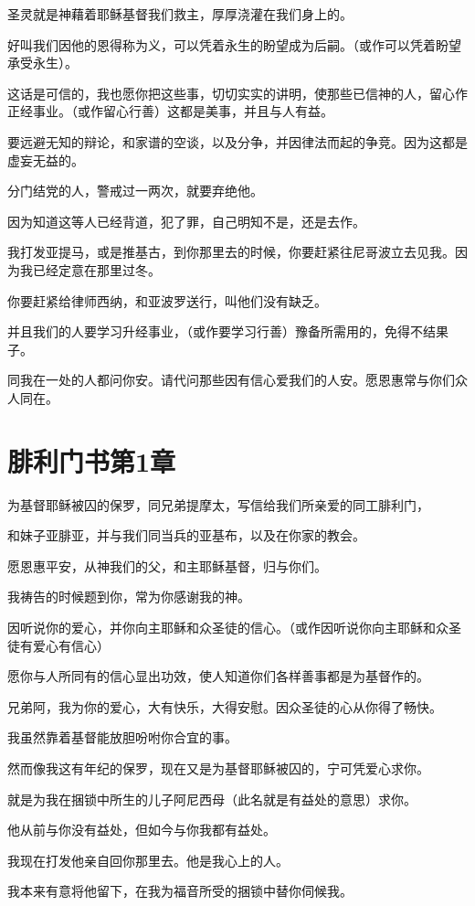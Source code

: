 \documentclass[12pt,oneside]{book}
\begin{document}
圣灵就是神藉着耶稣基督我们救主，厚厚浇灌在我们身上的。

好叫我们因他的恩得称为义，可以凭着永生的盼望成为后嗣。（或作可以凭着盼望承受永生）。

这话是可信的，我也愿你把这些事，切切实实的讲明，使那些已信神的人，留心作正经事业。（或作留心行善）这都是美事，并且与人有益。

要远避无知的辩论，和家谱的空谈，以及分争，并因律法而起的争竞。因为这都是虚妄无益的。

分门结党的人，警戒过一两次，就要弃绝他。

因为知道这等人已经背道，犯了罪，自己明知不是，还是去作。

我打发亚提马，或是推基古，到你那里去的时候，你要赶紧往尼哥波立去见我。因为我已经定意在那里过冬。

你要赶紧给律师西纳，和亚波罗送行，叫他们没有缺乏。

并且我们的人要学习升经事业，（或作要学习行善）豫备所需用的，免得不结果子。

同我在一处的人都问你安。请代问那些因有信心爱我们的人安。愿恩惠常与你们众人同在。

\chapter{腓利门书第1章}
为基督耶稣被囚的保罗，同兄弟提摩太，写信给我们所亲爱的同工腓利门，

和妹子亚腓亚，并与我们同当兵的亚基布，以及在你家的教会。

愿恩惠平安，从神我们的父，和主耶稣基督，归与你们。

我祷告的时候题到你，常为你感谢我的神。

因听说你的爱心，并你向主耶稣和众圣徒的信心。（或作因听说你向主耶稣和众圣徒有爱心有信心）

愿你与人所同有的信心显出功效，使人知道你们各样善事都是为基督作的。

兄弟阿，我为你的爱心，大有快乐，大得安慰。因众圣徒的心从你得了畅快。

我虽然靠着基督能放胆吩咐你合宜的事。

然而像我这有年纪的保罗，现在又是为基督耶稣被囚的，宁可凭爱心求你。

就是为我在捆锁中所生的儿子阿尼西母（此名就是有益处的意思）求你。

他从前与你没有益处，但如今与你我都有益处。

我现在打发他亲自回你那里去。他是我心上的人。

我本来有意将他留下，在我为福音所受的捆锁中替你伺候我。
\end{document}
